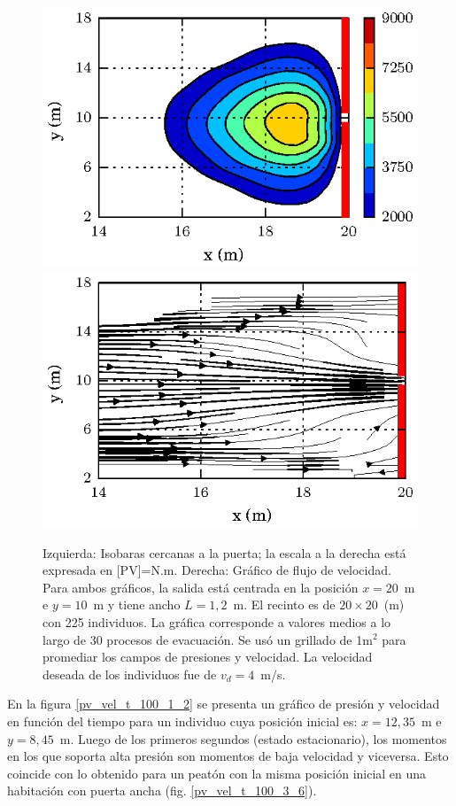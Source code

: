 \begin{figure}[H]
    \centering
    \includegraphics[scale=1]{figuras/fig4_version0.eps}
        \includegraphics[scale=1]{figuras/flujo_door_1_2m.eps}
    \caption[width=5cm]{Izquierda: Isobaras cercanas a la puerta; la escala a la derecha está expresada en [PV]=N.m. Derecha: Gráfico de flujo de velocidad. Para ambos gráficos, la salida está centrada en la posición $x=20$~m e $y=10$~m y tiene ancho $L=1,2$~m. El recinto es de $20\times 20$~(m) con 225 individuos. La gráfica corresponde a valores medios a lo largo de 30 procesos de evacuación. Se usó un grillado de 1m$^2$ para promediar los campos de presiones y velocidad. La velocidad deseada de los individuos fue de $v_d=4$~m/s.}
    \label{isobaras_flujo_1_2m}
\end{figure}
En la figura \ref{pv_vel_t_100_1_2} se presenta un gráfico de presión y velocidad en función del tiempo para un individuo cuya posición inicial es: $x=12,35$~m e $y=8,45$~m. Luego de los primeros segundos (estado estacionario), los momentos en los que soporta alta presión son momentos de baja velocidad y viceversa. Esto coincide con lo obtenido para un peatón con la misma posición inicial en una habitación con puerta ancha (fig. \ref{pv_vel_t_100_3_6}). \\
